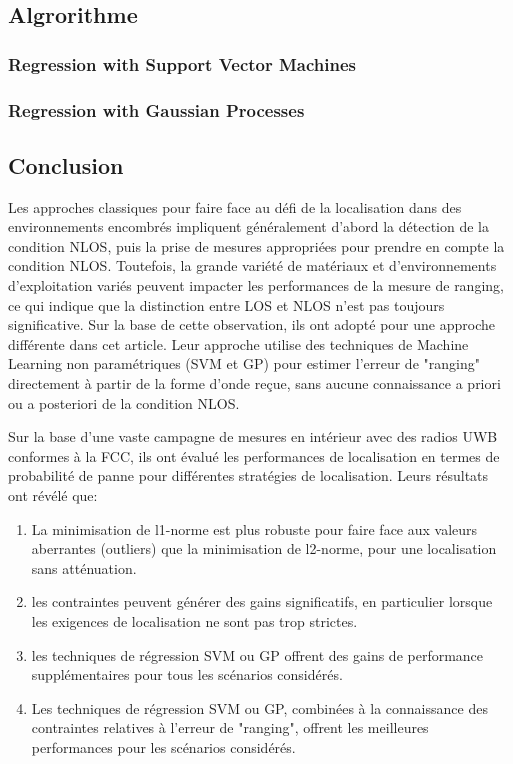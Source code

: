 \subsection{Algrorithme}
\subsubsection{Regression with Support Vector Machines}
\subsubsection{Regression with Gaussian Processes}

\subsection{Conclusion}
Les approches classiques pour faire face au défi de la localisation dans des environnements encombrés impliquent généralement d'abord la détection de la condition NLOS, puis la prise de mesures appropriées pour prendre en compte la condition NLOS. Toutefois, la grande variété de matériaux et d’environnements d’exploitation variés peuvent impacter les performances de la mesure de ranging, ce qui indique que la distinction entre LOS et NLOS n’est pas toujours significative. Sur la base de cette observation, ils ont adopté pour une approche différente dans cet article. Leur approche utilise des techniques de Machine Learning non paramétriques (SVM et GP) pour estimer l’erreur de "ranging" directement à partir de la forme d’onde reçue, sans aucune connaissance a priori ou a posteriori de la condition NLOS. 

Sur la base d'une vaste campagne de mesures en intérieur avec des radios UWB conformes à la FCC, ils ont évalué les performances de localisation en termes de probabilité de panne pour différentes stratégies de localisation. Leurs résultats ont révélé que: 

\begin{enumerate}
	\item La minimisation de l1-norme est plus robuste pour faire face aux valeurs aberrantes (outliers) que la minimisation de l2-norme, pour une localisation sans atténuation.
	\item les contraintes peuvent générer des gains significatifs, en particulier lorsque les exigences de localisation ne sont pas trop strictes.
	\item les techniques de régression SVM ou GP offrent des gains de performance supplémentaires pour tous les scénarios considérés.
	\item Les techniques de régression SVM ou GP, combinées à la connaissance des contraintes relatives à l'erreur de "ranging", offrent les meilleures performances pour les scénarios considérés.
\end{enumerate}

